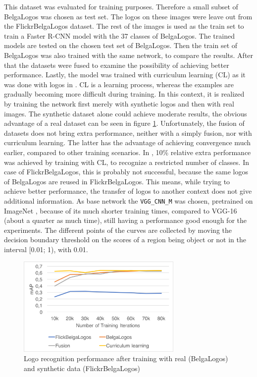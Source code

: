 This dataset was evaluated for training purposes. Therefore a small subset of BelgaLogos was chosen as test set. The logos on these images were leave out from the FlickrBelgaLogos dataset. The rest of the images is used as the train set to train a Faster R-CNN model with the 37 classes of BelgaLogos. The trained models are tested on the chosen test set of BelgaLogos. Then the train set of BelgaLogos was also trained with the same network, to compare the results. After that the datasets were fused to examine the possibility of achieving better performance. Lastly, the model was trained with curriculum learning \cite{Bengio_curriculumlearning} (CL) as it was done with logos in \cite{DBLP:journals/corr/SuZG16}. CL is a learning process, whereas the examples are gradually becoming more difficult during training. In this context, it is realized by training the network first merely with synthetic logos and then with real images.
\bigbreak
The synthetic dataset alone could achieve moderate results, the obvious advantage of a real dataset can be seen in figure \ref{f:flbltrain}. Unfortunately, the fusion of datasets does not bring extra performance, neither with a simply fusion, nor with curriculum learning. The latter has the advantage of achieving convergence much earlier, compared to other training scenarios. In \cite{DBLP:journals/corr/SuZG16}, 10\% relative extra performance was achieved by training with CL, to recognize a restricted number of classes. In case of FlickrBelgaLogos, this is probably not successful, because the same logos of BelgaLogos are reused in FlickrBelgaLogos. This means, while trying to achieve better performance, the transfer of logos to another context does not give additional information. As base network the \texttt{VGG\_CNN\_M} \cite{Chatfield14} was chosen, pretrained on ImageNet \cite{imagenet_cvpr09}, because of its much shorter training times, compared to VGG-16 (about a quarter as much time), still having a performance good enough for the experiments.
\bigbreak
The different points of the curves are collected by moving the decision boundary threshold on the scores of a region being object or not in the interval [0.01; 1), with 0.01.

\begin{figure}
  \centering
  \includegraphics[width=80mm]{images/mt/flbl.png}
  \caption{Logo recognition performance after training with real (BelgaLogos) and synthetic data (FlickrBelgaLogos)}
  \label{f:flbltrain}
\end{figure}

